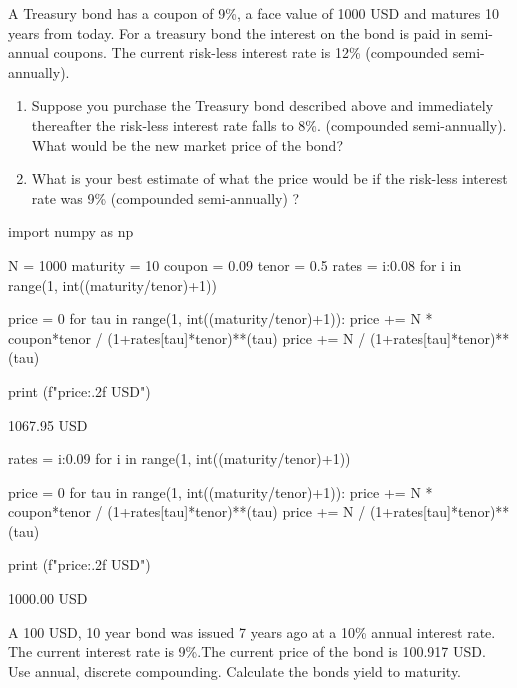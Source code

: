 \begin{question}
A Treasury bond has a coupon of 9\%, a face value of 1000 USD and matures 10 years from today. For a treasury bond the interest on the bond is paid in semi-annual coupons. The current risk-less interest rate is 12\% (compounded semi-annually).
\begin{enumerate}
\item Suppose you purchase the Treasury bond described above and immediately thereafter the risk-less interest rate falls to 8\%. (compounded semi-annually). What would be the new market price of the bond?
\item What is your best estimate of what the price would be if the risk-less interest rate was 9\% (compounded semi-annually) ?
\end{enumerate}
\end{question}

\cprotEnv\begin{solution}
\begin{ipython}
import numpy as np

N = 1000
maturity = 10
coupon = 0.09
tenor = 0.5
rates = {i:0.08 for i in range(1, int((maturity/tenor)+1))}

price = 0
for tau in range(1, int((maturity/tenor)+1)):
    price += N * coupon*tenor / (1+rates[tau]*tenor)**(tau)
price += N / (1+rates[tau]*tenor)**(tau) 

print (f"{price:.2f} USD")
\end{ipython}
\begin{ioutput}
1067.95 USD
\end{ioutput}

\begin{ipython}
rates = {i:0.09 for i in range(1, int((maturity/tenor)+1))}
	
price = 0
for tau in range(1, int((maturity/tenor)+1)):
    price += N * coupon*tenor / (1+rates[tau]*tenor)**(tau)
price += N / (1+rates[tau]*tenor)**(tau) 
	
print (f"{price:.2f} USD")
\end{ipython}
\begin{ioutput}
1000.00 USD
\end{ioutput}
\end{solution}

\begin{question}
A 100 USD, 10 year bond was issued 7 years ago at a 10\% annual interest rate. The current interest rate is 9\%.The current price of the bond is 100.917 USD. Use annual, discrete compounding. Calculate the bonds yield to maturity.
\end{question}

